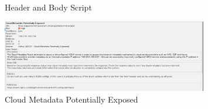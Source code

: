 \documentclass[openany]{report}
\begin{document}
\begin{enumerate}
\begin{figure}[h]
              \caption{Header and Body Script}
              \label{fig:my_label}
          \end{figure}
          \begin{figure}[h]
              \centering
              \includegraphics[width=0.8\textwidth]{imgs/High.jpg}
              \caption{Cloud Metadata Potentially Exposed}
              \label{fig:my_label1}
          \end{figure}

\end{enumerate}
\end{document}
